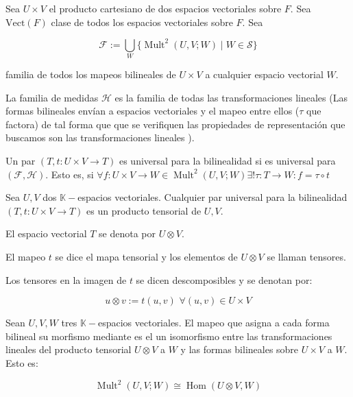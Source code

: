 \begin{defn}
	Sea $U\times V$ el producto cartesiano de dos espacios vectoriales sobre $F$. Sea $\text{Vect}(F)$ clase de todos los espacios vectoriales sobre $F$. Sea
	
	\begin{equation*}
		\mathcal{F} := \bigcup_W \{ \operatorname{Mult}^2(U,V;W)\mid W\in \mathcal{S}\}
	\end{equation*}
	
	familia de todos los mapeos bilineales de $U\times V$ a cualquier espacio vectorial $W$.
	
	La familia de medidas $\mathcal{H}$ es la familia de todas las transformaciones lineales (Las formas bilineales envían a espacios vectoriales y el mapeo entre ellos ($\tau$ que factora) de tal forma que que se verifiquen las propiedades de representación que buscamos son las transformaciones lineales ).
	
	Un par $(T,t:U\times V\to T)$ es universal para la bilinealidad si es universal para $(\mathcal{F}, \mathcal{H})$. Esto es, si $\forall f:U\times V \to W\in \operatorname{Mult}^2(U,V;W) \exists ! \tau : T \to W : f = \tau \circ t$
\end{defn}





\begin{defn}
	Sea $U, V$ dos $\mathbb{K}-$espacios vectoriales. Cualquier par universal para la bilinealidad $(T,t:U\times V \to T)$ es un producto tensorial de $U,V$.
	
	El espacio vectorial $T$ se denota por $U\otimes V$.
	
	El mapeo $t$ se dice el mapa tensorial y los elementos de  $U\otimes V$ se llaman tensores.
	
	Los tensores en la imagen de $t$ se dicen descomposibles y se denotan por:
	
	\begin{equation*}
		u \otimes v:= t(u,v) \, \, \forall (u,v) \in U \times V
	\end{equation*}
	
\end{defn}

\begin{thm}
	
	Sean $U,V,W$ tres $\mathbb{K}-$espacios vectoriales. El mapeo que asigna a cada forma bilineal su morfismo mediante es el un isomorfismo entre las transformaciones lineales del producto tensorial $U\otimes V$ a $W$ y las formas bilineales  sobre $U\times V$ a $W$. Esto es:
	
	\begin{equation*}
		\operatorname{Mult}^2(U,V; W) \cong \operatorname{Hom}(U{\otimes}V, W)
	\end{equation*}
\end{thm}

